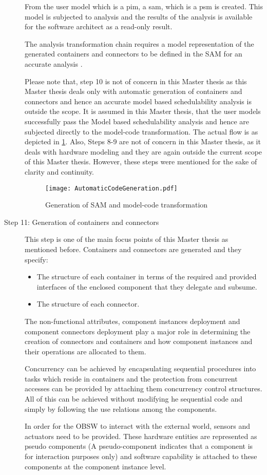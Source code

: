\begin{description}
From the user model which is a \ac{pim}, a \ac{sam}, which is a \ac{psm} is created. This model is subjected to analysis and the results of the analysis is available for the software architect as a read-only result. 

The analysis transformation chain requires a model representation of the generated containers and connectors to be defined in the SAM for an accurate analysis \cite{CompBasedProcess}.

Please note that, step 10 is not of concern in this Master thesis as this Master thesis deals only with automatic generation of containers and connectors and hence an accurate model based schedulability analysis is outside the scope. It is assumed in this Master thesis, that the user models successfully pass the Model based schedulability analysis and hence are  subjected directly to the model-code transformation. The actual flow is as depicted in \cref{fig: Automatic code generation}. Also, Steps 8-9 are not of concern in this Master thesis, as it deals with hardware modeling and they are again outside the current scope of this Master thesis. However, these steps were mentioned for the sake of clarity and continuity.

\begin{figure}[h]
	\centering
	\texttt{[image: AutomaticCodeGeneration.pdf]}
	\caption{Generation of SAM and model-code transformation}
	\label{fig: Automatic code generation}
\end{figure}

\item [Step 11: Generation of containers and connectors]  This step is one of the main focus points of this Master thesis as mentioned before. Containers and connectors are generated and they specify:
\begin{itemize}
\item The structure of each container in terms of the required and provided interfaces of the enclosed component that they delegate and subsume.
\item The structure of each connector. 
\end{itemize} 
The non-functional attributes, component instances deployment and component connectors deployment play a major role in determining the creation of connectors and containers and how component instances and their operations are allocated to them.

Concurrency can be achieved by encapsulating sequential procedures into tasks which reside in containers and the protection from concurrent accesses can be provided by attaching them concurrency control structures. All of this can be achieved without modifying he sequential code and simply by following the use relations among the components.

In order for the OBSW to interact with the external world, sensors and actuators need to be provided. These hardware entities are represented as pseudo components (A pseudo-component indicates that a component is for interaction purposes only) and software capability is attached to these components at the component instance level.    
\end{description}

